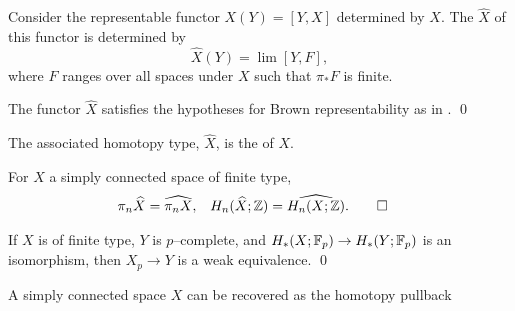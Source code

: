 \begin{definition}
Consider the representable functor $X(Y) = [Y, X]$ determined by $X$.
The  $\widehat X$ of this functor is determined by \[\widehat X(Y) = \lim [Y, F],\] where $F$ ranges over all spaces under $X$ such that $\pi_* F$ is finite.
\end{definition}

\begin{lemma}
The functor $\widehat X$ satisfies the hypotheses for Brown representability as in . \qed
\end{lemma}

\begin{definition}
The associated homotopy type, $\widehat X$, is the  of $X$.
\end{definition}

\begin{lemma}
For $X$ a simply connected space of finite type,
\begin{align*}
\pi_n \widehat X & = \widehat{\pi_n X}, &
H_n(\widehat X; \mathbb Z) & = \widehat{H_n(X; \mathbb Z)}.
\qed
\end{align*}
\end{lemma}

\begin{lemma}\label{WhatIsModPGoodFor}
If $X$ is of finite type, $Y$ is $p$--complete, and $H_*(X; \mathbb F_p) \to H_*(Y; \mathbb F_p)$ is an isomorphism, then $X_p \to Y$ is a weak equivalence. \qed
\end{lemma}

\begin{theorem}
A simply connected space $X$ can be recovered as the homotopy pullback
\begin{center}
\end{center}
\end{theorem}





